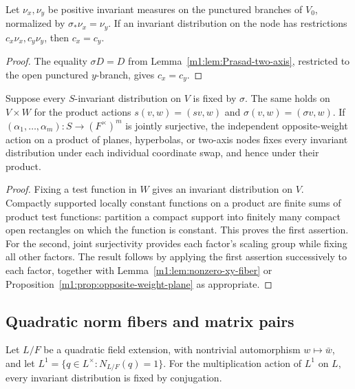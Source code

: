 \begin{corollary}\label{m1:cor:two-axis-coefficients}
Let $\nu_x,\nu_y$ be positive invariant measures on the punctured
branches of $V_0$, normalized by $\sigma_*\nu_x=\nu_y$. If an invariant distribution
on the node has restrictions $c_x\nu_x,c_y\nu_y$, then $c_x=c_y$.
\end{corollary}
\begin{proof}
The equality $\sigma D=D$ from Lemma~\ref{m1:lem:Prasad-two-axis},
restricted to the open punctured $y$-branch, gives $c_x=c_y$.
\end{proof}

\begin{lemma}
\label{m1:lem:passive-products}\label{m2:tools:passive}\label{m1:cor:opposite-weight-passive}
Suppose every $S$-invariant distribution on $V$ is fixed by $\sigma$.
The same holds on $V\times W$ for the product actions
$s(v,w)=(sv,w)$ and $\sigma(v,w)=(\sigma v,w)$.
If $(\alpha_1,\ldots,\alpha_m):S\to(F^\times)^m$ is jointly
surjective, the independent opposite-weight action on a product of
planes, hyperbolas, or two-axis nodes fixes every invariant distribution
under each individual coordinate swap, and hence under their product.
\end{lemma}
\begin{proof}
Fixing a test function in $W$ gives an invariant distribution on $V$.
Compactly supported locally constant functions on a product are finite
sums of product test functions: partition a compact support into finitely
many compact open rectangles on which the function is constant.
This proves the first assertion. For the second, joint surjectivity
provides each factor's scaling group while fixing all other factors.
The result follows by applying the first assertion successively to
each factor, together with Lemma~\ref{m1:lem:nonzero-xy-fiber} or
Proposition~\ref{m1:prop:opposite-weight-plane} as appropriate.
\end{proof}

\subsection{Quadratic norm fibers and matrix pairs}
\begin{lemma}\label{m2:elem:norm}
Let $L/F$ be a quadratic field extension, with nontrivial
automorphism $w\mapsto\bar w$, and let
$L^1=\{q\in L^\times:N_{L/F}(q)=1\}$. For the multiplication
action of $L^1$ on $L$, every invariant distribution is fixed by
conjugation.
\end{lemma}

